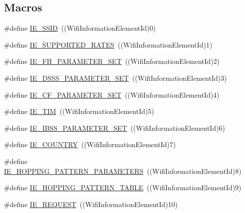 \subsection*{Macros}
\begin{DoxyCompactItemize}
\item 
\#define \hyperlink{wifi-information-element_8h_af85d627768f6e8129975b0dd86caed04}{I\+E\+\_\+\+S\+S\+ID}~((Wifi\+Information\+Element\+Id)0)
\item 
\#define \hyperlink{wifi-information-element_8h_aedfe612f7b8626caf6acbdac25392c62}{I\+E\+\_\+\+S\+U\+P\+P\+O\+R\+T\+E\+D\+\_\+\+R\+A\+T\+ES}~((Wifi\+Information\+Element\+Id)1)
\item 
\#define \hyperlink{wifi-information-element_8h_ab03f83f9b8efac2aa14514eaa85d04a2}{I\+E\+\_\+\+F\+H\+\_\+\+P\+A\+R\+A\+M\+E\+T\+E\+R\+\_\+\+S\+ET}~((Wifi\+Information\+Element\+Id)2)
\item 
\#define \hyperlink{wifi-information-element_8h_ae0fd0b67063d8602bc4b99e327c349f9}{I\+E\+\_\+\+D\+S\+S\+S\+\_\+\+P\+A\+R\+A\+M\+E\+T\+E\+R\+\_\+\+S\+ET}~((Wifi\+Information\+Element\+Id)3)
\item 
\#define \hyperlink{wifi-information-element_8h_a2859bbc22c9815d38d8d3d5290b0c7a7}{I\+E\+\_\+\+C\+F\+\_\+\+P\+A\+R\+A\+M\+E\+T\+E\+R\+\_\+\+S\+ET}~((Wifi\+Information\+Element\+Id)4)
\item 
\#define \hyperlink{wifi-information-element_8h_a02891d4eb11f1c1f861ecb690fbe3277}{I\+E\+\_\+\+T\+IM}~((Wifi\+Information\+Element\+Id)5)
\item 
\#define \hyperlink{wifi-information-element_8h_a6356da991beba7057d9f0a0aa551ec8f}{I\+E\+\_\+\+I\+B\+S\+S\+\_\+\+P\+A\+R\+A\+M\+E\+T\+E\+R\+\_\+\+S\+ET}~((Wifi\+Information\+Element\+Id)6)
\item 
\#define \hyperlink{wifi-information-element_8h_a9f745bb0fd3d650d7094faa0fa220e84}{I\+E\+\_\+\+C\+O\+U\+N\+T\+RY}~((Wifi\+Information\+Element\+Id)7)
\item 
\#define \hyperlink{wifi-information-element_8h_a53aa0a0ee951aca847755b9d880b0435}{I\+E\+\_\+\+H\+O\+P\+P\+I\+N\+G\+\_\+\+P\+A\+T\+T\+E\+R\+N\+\_\+\+P\+A\+R\+A\+M\+E\+T\+E\+RS}~((Wifi\+Information\+Element\+Id)8)
\item 
\#define \hyperlink{wifi-information-element_8h_ae49afb5ca92ae4d93c6f02800858a1cd}{I\+E\+\_\+\+H\+O\+P\+P\+I\+N\+G\+\_\+\+P\+A\+T\+T\+E\+R\+N\+\_\+\+T\+A\+B\+LE}~((Wifi\+Information\+Element\+Id)9)
\item 
\#define \hyperlink{wifi-information-element_8h_a4bb7840dbcde65eb1900a84f9eb2c7b0}{I\+E\+\_\+\+R\+E\+Q\+U\+E\+ST}~((Wifi\+Information\+Element\+Id)10)

\end{DoxyCompactItemize}
